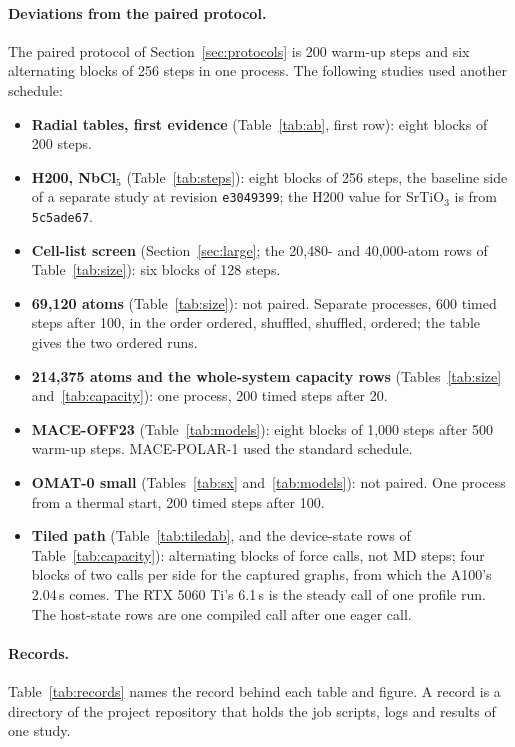 \documentclass[11pt]{article}
\begin{document}
\paragraph{Deviations from the paired protocol.}
The paired protocol of Section~\ref{sec:protocols} is 200 warm-up steps and six alternating blocks of 256 steps
in one process. The following studies used another schedule:
\begin{itemize}\setlength{\itemsep}{0.1em}
\item \textbf{Radial tables, first evidence} (Table~\ref{tab:ab}, first row): eight blocks of 200 steps.
\item \textbf{H200, NbCl$_5$} (Table~\ref{tab:steps}): eight blocks of 256 steps, the baseline side of a
      separate study at revision \texttt{e3049399}; the H200 value for SrTiO$_3$ is from \texttt{5c5ade67}.
\item \textbf{Cell-list screen} (Section~\ref{sec:large}; the 20{,}480- and 40{,}000-atom rows of
      Table~\ref{tab:size}): six blocks of 128 steps.
\item \textbf{69{,}120 atoms} (Table~\ref{tab:size}): not paired. Separate processes, 600 timed steps after
      100, in the order ordered, shuffled, shuffled, ordered; the table gives the two ordered runs.
\item \textbf{214{,}375 atoms and the whole-system capacity rows} (Tables~\ref{tab:size}
      and~\ref{tab:capacity}): one process, 200 timed steps after 20.
\item \textbf{MACE-OFF23} (Table~\ref{tab:models}): eight blocks of 1{,}000 steps after 500 warm-up steps.
      MACE-POLAR-1 used the standard schedule.
\item \textbf{OMAT-0 small} (Tables~\ref{tab:sx} and~\ref{tab:models}): not paired. One process from a thermal
      start, 200 timed steps after 100.
\item \textbf{Tiled path} (Table~\ref{tab:tiledab}, and the device-state rows of Table~\ref{tab:capacity}):
      alternating blocks of force calls, not MD steps; four blocks of two calls per side for the captured
      graphs, from which the A100's 2.04\,s comes. The RTX 5060 Ti's 6.1\,s is the steady call of one profile
      run. The host-state rows are one compiled call after one eager call.
\end{itemize}

\paragraph{Records.}
Table~\ref{tab:records} names the record behind each table and figure. A record is a directory of the project
repository that holds the job scripts, logs and results of one study.
\end{document}
